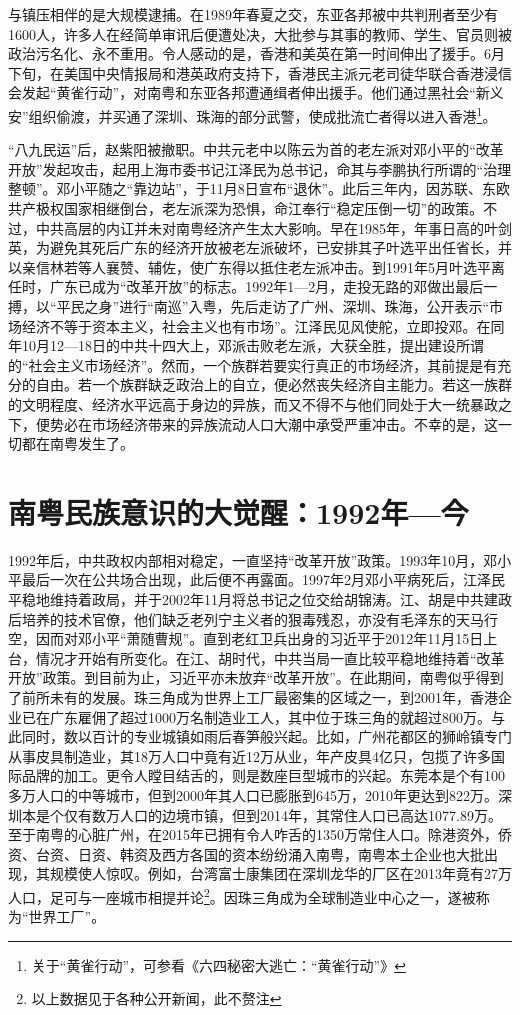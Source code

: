 与镇压相伴的是大规模逮捕。在1989年春夏之交，东亚各邦被中共判刑者至少有1600人，许多人在经简单审讯后便遭处决，大批参与其事的教师、学生、官员则被政治污名化、永不重用。令人感动的是，香港和美英在第一时间伸出了援手。6月下旬，在美国中央情报局和港英政府支持下，香港民主派元老司徒华联合香港浸信会发起“黄雀行动”，对南粤和东亚各邦遭通缉者伸出援手。他们通过黑社会“新义安”组织偷渡，并买通了深圳、珠海的部分武警，使成批流亡者得以进入香港\footnote{关于“黄雀行动”，可参看《六四秘密大逃亡：“黄雀行动”》}。

“八九民运”后，赵紫阳被撤职。中共元老中以陈云为首的老左派对邓小平的“改革开放”发起攻击，起用上海市委书记江泽民为总书记，命其与李鹏执行所谓的“治理整顿”。邓小平随之“靠边站”，于11月8日宣布“退休”。此后三年内，因苏联、东欧共产极权国家相继倒台，老左派深为恐惧，命江奉行“稳定压倒一切”的政策。不过，中共高层的内讧并未对南粤经济产生太大影响。早在1985年，年事日高的叶剑英，为避免其死后广东的经济开放被老左派破坏，已安排其子叶选平出任省长，并以亲信林若等人襄赞、辅佐，使广东得以抵住老左派冲击。到1991年5月叶选平离任时，广东已成为“改革开放”的标志。1992年1—2月，走投无路的邓做出最后一搏，以“平民之身”进行“南巡”入粤，先后走访了广州、深圳、珠海，公开表示“市场经济不等于资本主义，社会主义也有市场”。江泽民见风使舵，立即投邓。在同年10月12—18日的中共十四大上，邓派击败老左派，大获全胜，提出建设所谓的“社会主义市场经济”。然而，一个族群若要实行真正的市场经济，其前提是有充分的自由。若一个族群缺乏政治上的自立，便必然丧失经济自主能力。若这一族群的文明程度、经济水平远高于身边的异族，而又不得不与他们同处于大一统暴政之下，便势必在市场经济带来的异族流动人口大潮中承受严重冲击。不幸的是，这一切都在南粤发生了。

\section{南粤民族意识的大觉醒：1992年—今}

\indent 1992年后，中共政权内部相对稳定，一直坚持“改革开放”政策。1993年10月，邓小平最后一次在公共场合出现，此后便不再露面。1997年2月邓小平病死后，江泽民平稳地维持着政局，并于2002年11月将总书记之位交给胡锦涛。江、胡是中共建政后培养的技术官僚，他们缺乏老列宁主义者的狠毒残忍，亦没有毛泽东的天马行空，因而对邓小平“萧随曹规”。直到老红卫兵出身的习近平于2012年11月15日上台，情况才开始有所变化。在江、胡时代，中共当局一直比较平稳地维持着“改革开放”政策。到目前为止，习近平亦未放弃“改革开放”。在此期间，南粤似乎得到了前所未有的发展。珠三角成为世界上工厂最密集的区域之一，到2001年，香港企业已在广东雇佣了超过1000万名制造业工人，其中位于珠三角的就超过800万。与此同时，数以百计的专业城镇如雨后春笋般兴起。比如，广州花都区的狮岭镇专门从事皮具制造业，其18万人口中竟有近12万从业，年产皮具4亿只，包揽了许多国际品牌的加工。更令人瞠目结舌的，则是数座巨型城市的兴起。东莞本是个有100多万人口的中等城市，但到2000年其人口已膨胀到645万，2010年更达到822万。深圳本是个仅有数万人口的边境市镇，但到2014年，其常住人口已高达1077.89万。至于南粤的心脏广州，在2015年已拥有令人咋舌的1350万常住人口。除港资外，侨资、台资、日资、韩资及西方各国的资本纷纷涌入南粤，南粤本土企业也大批出现，其规模使人惊叹。例如，台湾富士康集团在深圳龙华的厂区在2013年竟有27万人口，足可与一座城市相提并论\footnote{以上数据见于各种公开新闻，此不赘注}。因珠三角成为全球制造业中心之一，遂被称为“世界工厂”。

